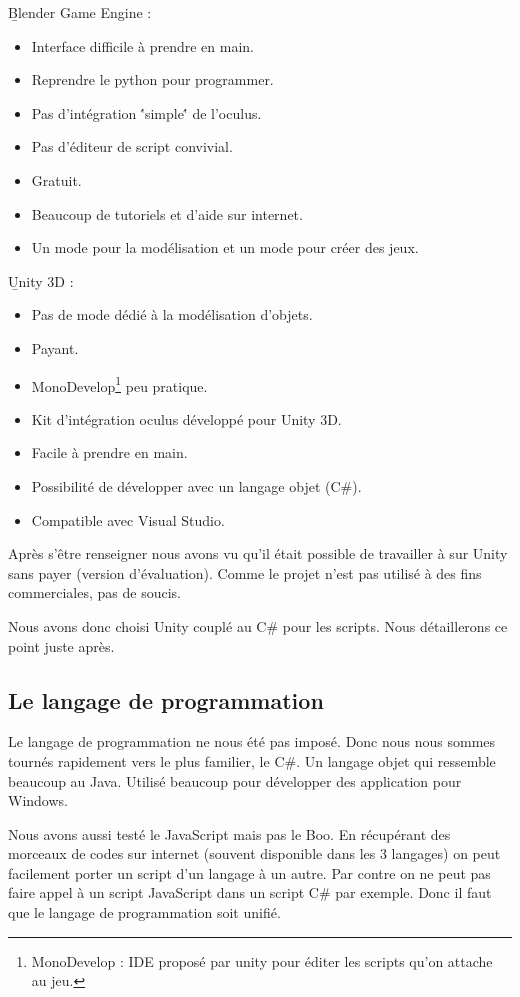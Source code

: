 \documentclass[a4paper,11pt]{myreport}
\begin{document}
  \begin{description}
  	\item \b{Blender Game Engine :}
  	\begin{itemize}
  		\item Interface difficile à prendre en main.
  		\item Reprendre le python pour programmer.
  		\item Pas d'intégration \''simple\'' de l'oculus.
  		\item Pas d'éditeur de script convivial.
  		\item Gratuit.
  		\item Beaucoup de tutoriels et d'aide sur internet.
  		\item Un mode pour la modélisation et un mode pour créer des jeux.
  	\end{itemize}
  	\item \b{Unity 3D :}
  		\begin{itemize}
  			\item Pas de mode dédié à la modélisation d'objets.
  			\item Payant.
  			\item MonoDevelop\footnote{MonoDevelop : IDE proposé par unity pour éditer les scripts qu'on attache au jeu.} peu pratique.
  			\item Kit d'intégration oculus développé pour Unity 3D.
  			\item Facile à prendre en main.
  			\item Possibilité de développer avec un langage objet (C\#).
  			\item Compatible avec Visual Studio.
  		\end{itemize}
  \end{description}
  
  \par Après s'être renseigner nous avons vu qu'il était possible de travailler à sur Unity sans payer (version d'évaluation). Comme le projet n'est pas utilisé à des fins commerciales, pas de soucis.
  \par Nous avons donc choisi Unity couplé au C\# pour les scripts. Nous détaillerons ce point juste après.
  
  \subsection{Le langage de programmation}
  \par Le langage de programmation ne nous été pas imposé. Donc nous nous sommes tournés rapidement vers le plus familier, le C\#. Un langage objet qui ressemble beaucoup au Java. Utilisé beaucoup pour développer des application pour Windows.
  \par Nous avons aussi testé le JavaScript mais pas le Boo. En récupérant des morceaux de codes sur internet (souvent disponible dans les 3 langages) on peut facilement porter un script d'un langage à un autre.
  Par contre on ne peut pas faire appel à un script JavaScript dans un script C\# par exemple. Donc il faut que le langage de programmation soit unifié.
\end{document}
